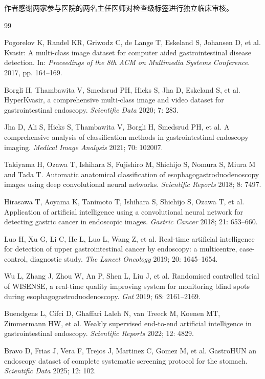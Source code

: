 \documentclass[Afour,sagev,times]{sagej}
\begin{document}
作者感谢两家参与医院的两名主任医师对检查级标签进行独立临床审核。

\renewcommand{\refname}{参考文献}
\begin{thebibliography}{99}

Pogorelov K, Randel KR, Griwodz C, de Lange T, Eskeland S, Johansen D, et al. Kvasir: A multi-class image dataset for computer aided gastrointestinal disease detection. In: \textit{Proceedings of the 8th ACM on Multimedia Systems Conference}. 2017, pp. 164--169.

Borgli H, Thambawita V, Smedsrud PH, Hicks S, Jha D, Eskeland S, et al. HyperKvasir, a comprehensive multi-class image and video dataset for gastrointestinal endoscopy. \textit{Scientific Data} 2020; 7: 283.

Jha D, Ali S, Hicks S, Thambawita V, Borgli H, Smedsrud PH, et al. A comprehensive analysis of classification methods in gastrointestinal endoscopy imaging. \textit{Medical Image Analysis} 2021; 70: 102007.

Takiyama H, Ozawa T, Ishihara S, Fujishiro M, Shichijo S, Nomura S, Miura M and Tada T. Automatic anatomical classification of esophagogastroduodenoscopy images using deep convolutional neural networks. \textit{Scientific Reports} 2018; 8: 7497.

Hirasawa T, Aoyama K, Tanimoto T, Ishihara S, Shichijo S, Ozawa T, et al. Application of artificial intelligence using a convolutional neural network for detecting gastric cancer in endoscopic images. \textit{Gastric Cancer} 2018; 21: 653--660.

Luo H, Xu G, Li C, He L, Luo L, Wang Z, et al. Real-time artificial intelligence for detection of upper gastrointestinal cancer by endoscopy: a multicentre, case-control, diagnostic study. \textit{The Lancet Oncology} 2019; 20: 1645--1654.

Wu L, Zhang J, Zhou W, An P, Shen L, Liu J, et al. Randomised controlled trial of WISENSE, a real-time quality improving system for monitoring blind spots during esophagogastroduodenoscopy. \textit{Gut} 2019; 68: 2161--2169.

Buendgens L, Cifci D, Ghaffari Laleh N, van Treeck M, Koenen MT, Zimmermann HW, et al. Weakly supervised end-to-end artificial intelligence in gastrointestinal endoscopy. \textit{Scientific Reports} 2022; 12: 4829.

Bravo D, Frias J, Vera F, Trejos J, Martinez C, Gomez M, et al. GastroHUN an endoscopy dataset of complete systematic screening protocol for the stomach. \textit{Scientific Data} 2025; 12: 102.


\end{thebibliography}
\end{document}
